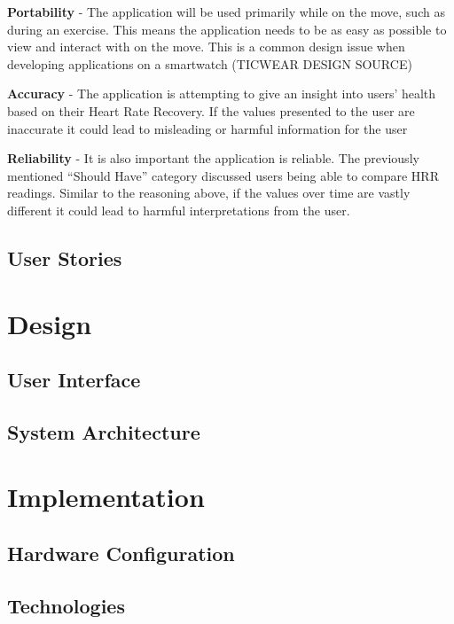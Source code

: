 \documentclass{l4proj}
\begin{document}
\textbf{Portability} -  The application will be used primarily while on the move, such as during an exercise. This means the application needs to be as easy as possible to view and interact with on the move. This is a common design issue when developing applications on a smartwatch (TICWEAR DESIGN SOURCE)

\textbf{Accuracy} - The application is attempting to give an insight into users' health based on their Heart Rate Recovery. If the values presented to the user are inaccurate it could lead to misleading or harmful information for the user

\textbf{Reliability} - It is also important the application is reliable. The previously mentioned “Should Have” category discussed users being able to compare HRR readings. Similar to the reasoning above, if the values over time are vastly different it could lead to harmful interpretations from the user.

\section{User Stories}

\chapter{Design}

\section{User Interface}

\section{System Architecture}

\chapter{Implementation}

\section{Hardware Configuration}

\section{Technologies}
\end{document}
